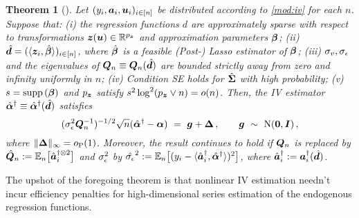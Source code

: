 \documentclass{uwstat572}
\newcommand{\benn}{\begin{equation*}}
\newcommand{\eenn}{\end{equation*}}
\newtheorem{thm}{Theorem}[section]
\theoremstyle{definition}
\theoremstyle{remark}
\newcommand{\R}{\ensuremath{\mathbb{R}}}
\newcommand{\Id}{\bs{I}}
\newcommand{\supp}{\mathrm{supp} \,}
\newcommand{\Prb}{\mathrm{P}}
\newcommand{\Ex}{\mathbb{E}}
\newcommand{\Exn}{\Ex_n}
\newcommand{\Normal}{\mathrm{N}}
\newcommand{\bs}[1]{\boldsymbol{#1}}
\numberwithin{equation}{section}
\begin{document}
\begin{thm}[{\cite[Theorem 3]{BCH11}}]
Let $(y_i, \a_i, \u_i)_{i\inn}$ be distributed according to \eqref{mod:iv} for each $n$. Suppose that: (i) the regression functions $d$ are approximately sparse with respect to transformations $\z(\u) \in \R^{\pz}$ and approximation parameters $\regb$; (ii) $\dhat = (\langle \z_i,\regbh\rangle)_{i\inn}$, where $\regbh$ is a feasible (Post-) Lasso estimator of $\regb$; (iii) $\sigma_v, \sigma_\epsilon$ and the eigenvalues of $\Qn \equiv \Qn(\dhat)$ are bounded strictly away from zero and infinity uniformly in $n$; (iv) Condition SE holds for $\gramhat$ with high probability; (v) $s = \supp(\regb)$ and $\pz$ satisfy $\sb^2\log^2(\pz\vee n) = o(n)$. Then, the IV estimator $\regaiv \equiv \regaiv(\dhat)$ satisfies
\benn
	(\sds^2\Qn^{-1})^{-1/2} \sqrt{n}(\regaiv-\rega) \ = \ \g + \rm\,, \qquad \g \ \sim \ \Normal(\bs{0}, \Id) \,,
\eenn
where $\|\rm\|_\infty = o_\Prb(1)$. Moreover, the result continues to hold if $\Qn$ is replaced by $\Qnhat := \Exn\big[\ainstihatkpt\big]$ and $\sigma_\epsilon^2$ by $\sdshat^2 := \Exn\big[(y_i -\langle \ainstihat, \regaiv\rangle)^2\big]$, where $\ainstihat := \ainsti(\dhat)$. 
\end{thm}

The upshot of the foregoing theorem is that nonlinear IV estimation needn't incur efficiency penalties for high-dimensional series estimation of the endogenous regression functions. 
\end{document}
